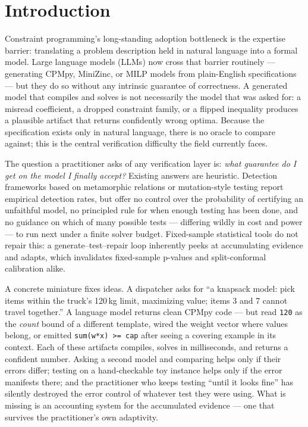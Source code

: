 \documentclass[pdflatex,sn-mathphys-num]{sn-jnl}
\theoremstyle{thmstyleone}
\theoremstyle{thmstyletwo}
\begin{document}
\maketitle

\section{Introduction}\label{sec:intro}

Constraint programming's long-standing adoption bottleneck is the
expertise barrier: translating a problem description held in natural
language into a formal model. Large language models (LLMs) now cross
that barrier routinely --- generating CPMpy, MiniZinc, or MILP models
from plain-English specifications \cite{michailidis2024icl,
shi2025constraintllm, szeider2025cpagent} --- but they do so without
any intrinsic guarantee of correctness. A generated model that
compiles and solves is not necessarily the model that was asked for:
a misread coefficient, a dropped constraint family, or a flipped
inequality produces a plausible artifact that returns confidently
wrong optima. Because the specification exists only in natural
language, there is no oracle to compare against; this is the central
verification difficulty the field currently faces.

The question a practitioner asks of any verification layer is:
\emph{what guarantee do I get on the model I finally accept?} Existing
answers are heuristic. Detection frameworks based on metamorphic
relations or mutation-style testing report empirical detection rates,
but offer no control over the probability of certifying an unfaithful
model, no principled rule for when enough testing has been done, and
no guidance on which of many possible tests --- differing wildly in
cost and power --- to run next under a finite solver budget.
Fixed-sample statistical tools do not repair this: a
generate--test--repair loop inherently peeks at accumulating evidence
and adapts, which invalidates fixed-sample p-values and
split-conformal calibration alike.

A concrete miniature fixes ideas. A dispatcher asks for ``a knapsack
model: pick items within the truck's 120\,kg limit, maximizing value;
items 3 and 7 cannot travel together.'' A language model returns
clean CPMpy code --- but read \texttt{120} as the \emph{count} bound
of a different template, wired the weight vector where values belong,
or emitted \texttt{sum(w*x) >= cap} after seeing a covering example
in its context. Each of these artifacts compiles, solves in
milliseconds, and returns a confident number. Asking a second model
and comparing helps only if their errors differ; testing on a
hand-checkable toy instance helps only if the error manifests there;
and the practitioner who keeps testing ``until it looks fine'' has
silently destroyed the error control of whatever test they were
using. What is missing is an accounting system for the accumulated
evidence --- one that survives the practitioner's own adaptivity.
\end{document}
